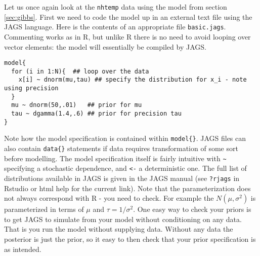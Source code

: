 \documentclass[10pt] {article}
\theoremstyle{definition}
\begin{document}
Let us once again look at the {\tt nhtemp} data using the model from section \ref{sec:gibbs}. First we need to code the model up in an external text file using the JAGS language. Here is the contents of an appropriate file {\tt basic.jags}. Commenting works as in R, but unlike R there is no need to avoid looping over vector elements: the model will essentially be compiled by JAGS.   
\begin{lstlisting}
model{
  for (i in 1:N){  ## loop over the data
    x[i] ~ dnorm(mu,tau) ## specify the distribution for x_i - note using precision 
  }
  mu ~ dnorm(50,.01)   ## prior for mu
  tau ~ dgamma(1.4,.6) ## prior for precision tau
}
\end{lstlisting}
Note how the model specification is contained within \lstinline+model{}+. JAGS files can also contain \lstinline+data{}+ statements if data requires transformation of some sort before modelling. The model specification itself is fairly intuitive with \verb+~+ specifying a stochastic dependence, and \verb+<-+ a deterministic one. The full list of distributions available in JAGS is given in the JAGS manual (see {\tt ?rjags} in Rstudio or html help for the current link). Note that the parameterization does not always correspond with R - you need to check. For example the $N(\mu,\sigma^2)$ is parameterized in terms of $\mu$ and $\tau=1/\sigma^2$. One easy way to check your priors is to get JAGS to simulate from your model without conditioning on any data. That is you run the model without supplying data. Without any data the posterior is just the prior, so it easy to then check that your prior specification is as intended. 
\end{document}
